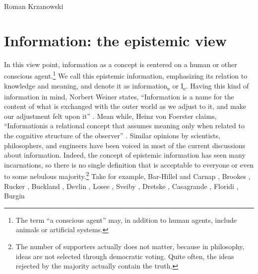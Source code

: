 \begin{artengenv}{Roman Krzanowski}
\section{Information: the epistemic view}
In this view point, information as a concept is centered on a human or other conscious agent.\footnote{The term ``a conscious agent'' may, in addition to human agents, include animals or artificial systems.} We call this epistemic information, emphasizing its relation to knowledge and meaning, and denote it as information\textsubscript{e} or I\textsubscript{e}. Having this kind of information in mind, Norbert Weiner states, ``Information is a name for the content of what is exchanged with the outer world as we adjust to it, and make our adjustment felt upon it''
\parencite[][p.17]{wiener_human_1989}. %
 Mean while, Heinz von Foerster claims, ``Informationis a relational concept that assumes meaning only when related to the cognitive structure of the observer'' 
\parencite[][p.3]{foerster_epistemology_1980}. %
 Similar opinions by scientists, philosophers, and engineers have been voiced in most of the current discussions about information. Indeed, the concept of epistemic information has seen many incarnations, so there is no single definition that is acceptable to everyone or even to some nebulous majority.\footnote{The number of supporters actually does not matter, because in philosophy, ideas are not selected through democratic voting. Quite often, the ideas rejected by the majority actually contain the truth.} Take for example, Bar-Hillel and Carnap 
\parencite*[][]{bar-hillel_semantic_1953}, %
 Brookes 
\parencite*[][]{brookes_foundations_1980}, %
 Rucker 
\parencite*[][]{rucker_mind_2013}, %
Buckland
\parencite*[][]{buckland_information_1991}, %
 Devlin 
\parencite*[][]{devlin_logic_1991}, %
 Losee 
\parencite*[][]{losee_discipline_1997}, %
 Sveiby 
\parencite*[][]{sveiby_what_1998}, %
 Dretske 
\parencite*[][]{dretske_knowledge_1999}, %
 Casagrande 
\parencite*[][]{casagrande_information_1999}, %
 Floridi 
\parencites*[][]{floridi_information_2010}[][]{floridi_philosophy_2010}, %
Burgin

\end{artengenv}
